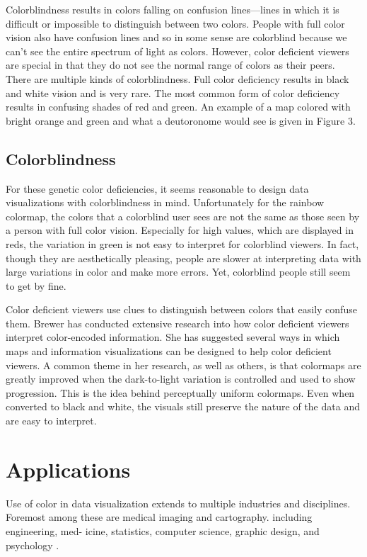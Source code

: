 \documentclass[journal]{IEEEtran}
\begin{document}
Colorblindness results in colors falling on confusion lines---lines in which it
is difficult or impossible to distinguish between two colors. People with full
color vision also have confusion lines and so in some sense are colorblind because 
we can't see the entire spectrum of light as colors. However, color deficient viewers
are special in that they do not see the normal range of colors as their peers.
There are multiple kinds of colorblindness.
Full color deficiency results in black and white vision and is very rare.
The most common form of color deficiency results in confusing shades of red and green.
An example of a map colored with bright orange and green and what a deutoronome
would see is given in Figure 3.

\subsection{Colorblindness}

For these genetic color deficiencies, it seems reasonable to design data
visualizations with colorblindness in mind. Unfortunately for the rainbow colormap,
the colors that a colorblind user sees are not the same as those seen by a person
with full color vision. Especially for high values, which are displayed in reds,
the variation in green is not easy to interpret for colorblind viewers. In fact,
though they are aesthetically pleasing, people are slower at interpreting data with
large variations in color and make more errors. Yet, colorblind people still seem
to get by fine.

Color deficient viewers use clues to distinguish between colors that easily confuse them.
Brewer has conducted extensive research into how color deficient
viewers interpret color-encoded information. She has suggested several ways in which 
maps and information visualizations can be designed to help color deficient viewers.
A common theme in her research, as well as others, is that colormaps are greatly
improved when the dark-to-light variation is controlled and used to show progression.
This is the idea behind perceptually uniform colormaps. Even when converted to black
and white, the visuals still preserve the nature of the data and are easy to interpret.



%

\section{Applications}
Use of color in data visualization extends to multiple
industries and disciplines. Foremost among these are medical imaging
and cartography. including engineering, med-
icine, statistics, computer science, graphic design, and
psychology \cite{colorguidelines}.
\end{document}

